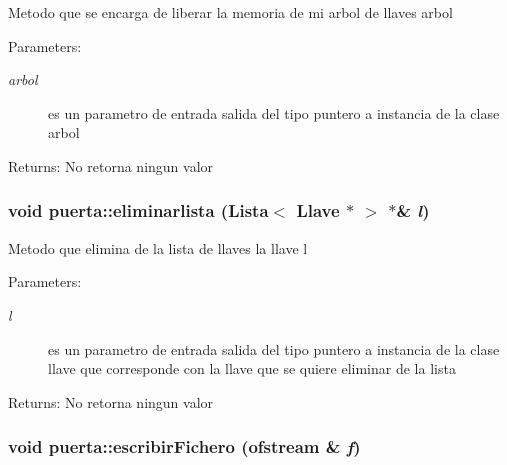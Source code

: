 Metodo que se encarga de liberar la memoria de mi arbol de llaves arbol \begin{Desc}
\item[Parameters:]
\begin{description}
\item[{\em arbol}]es un parametro de entrada salida del tipo puntero a instancia de la clase arbol \end{description}
\end{Desc}
\begin{Desc}
\item[Returns:]No retorna ningun valor \end{Desc}
\hypertarget{classpuerta_e2bcee3940c85671615c2331bba3b755}{
\subsubsection[eliminarlista]{\setlength{\rightskip}{0pt plus 5cm}void puerta::eliminarlista (Lista$<$ {\bf Llave} $\ast$ $>$ $\ast$\& {\em l})}}
\label{classpuerta_e2bcee3940c85671615c2331bba3b755}


Metodo que elimina de la lista de llaves la llave l \begin{Desc}
\item[Parameters:]
\begin{description}
\item[{\em l}]es un parametro de entrada salida del tipo puntero a instancia de la clase llave que corresponde con la llave que se quiere eliminar de la lista \end{description}
\end{Desc}
\begin{Desc}
\item[Returns:]No retorna ningun valor \end{Desc}
\hypertarget{classpuerta_db48cb6b90ccdc012aa488850ac458b1}{
\subsubsection[escribirFichero]{\setlength{\rightskip}{0pt plus 5cm}void puerta::escribirFichero (ofstream \& {\em f})}}
\label{classpuerta_db48cb6b90ccdc012aa488850ac458b1}


